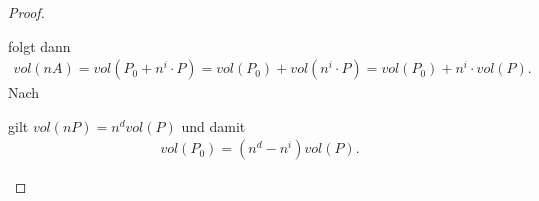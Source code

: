 \documentclass[11pt,titlepage]{article}
\theoremstyle{definition}
\theoremstyle{remark}
\begin{document}
\begin{proof}
\begin{itemize}
			
			folgt dann
			\begin{align*}
				vol(nA)=vol(P_0+n^i\cdot P)=vol(P_0)+vol(n^i\cdot P)=vol(P_0)+
				n^i\cdot vol(P).
			\end{align*}
			Nach 
			
			
			gilt $vol(nP)=n^d vol(P)$ und damit 
			\begin{align}
				vol(P_0)=(n^d -n^i)vol(P). \label{thm:zerlerg;7}
			\end{align}
		\end{itemize}
	\end{proof}
	
	
	\newpage
	
	
\end{document}
